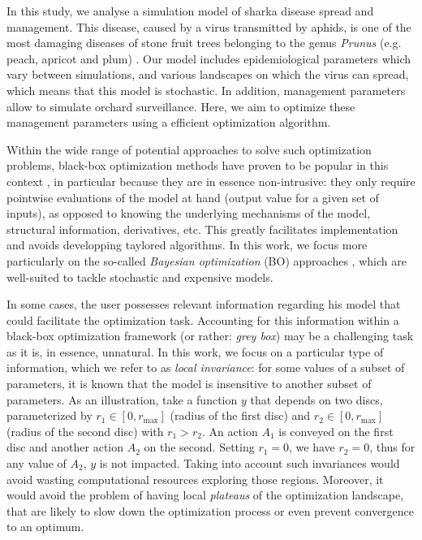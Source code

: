 In this study, we analyse a simulation model of sharka disease spread and management. This disease, caused by a virus transmitted by aphids, is one of the most damaging diseases of stone fruit trees belonging to the genus \textit{Prunus} (e.g. peach, apricot and plum) \cite{cambra2006plum,rimbaud2015sharka}.
Our model includes epidemiological parameters which vary between simulations, and various landscapes on which the virus can spread, which means that this model is stochastic. 
In addition, management parameters allow to simulate orchard surveillance. Here, we aim to optimize these management parameters using a efficient optimization algorithm.

Within the wide range of potential approaches to solve such optimization problems, black-box optimization methods have proven to be popular in this context \cite{rios2013derivative}, 
in particular because they are in essence non-intrusive: they only require pointwise evaluations of the model at hand (output value for a given set of inputs), 
as opposed to knowing the underlying mechanisms of the model, structural information, derivatives, etc. This greatly facilitates implementation and avoids developping taylored algorithms.
In this work, we focus more particularly on the so-called \textit{Bayesian optimization} (BO) approaches \cite{mockus2012bayesian,shahriari2016taking},
which are well-suited to tackle stochastic and expensive models.

In some cases, the user possesses relevant information regarding his model that could facilitate the optimization task.
Accounting for this information within a black-box optimization framework (or rather: \textit{grey box}) may be a challenging task
as it is, in essence, unnatural. In this work, we focus on a particular type of information, which we refer to as \textit{local invariance}:
for some values of a subset of parameters, it is known that the model is insensitive to another subset of parameters. 
As an illustration, take a function $y$ that depends on two discs, parameterized by $r_1 \in [0, r_{\max}]$ (radius of the first disc) and $r_2 \in [0, r_{\max}]$ (radius of the second disc) with $r_1 > r_2$. 
An action $A_1$ is conveyed on the first disc and another action $A_2$ on the second. Setting $r_1=0$, we have $r_2=0$, thus for any value of $A_2$, $y$ is not impacted. 
Taking into account such invariances would avoid wasting computational resources exploring those regions. 
Moreover, it would avoid the problem of having local \textit{plateaus} of the optimization landscape, 
that are likely to slow down the optimization process or even prevent convergence to an optimum.


